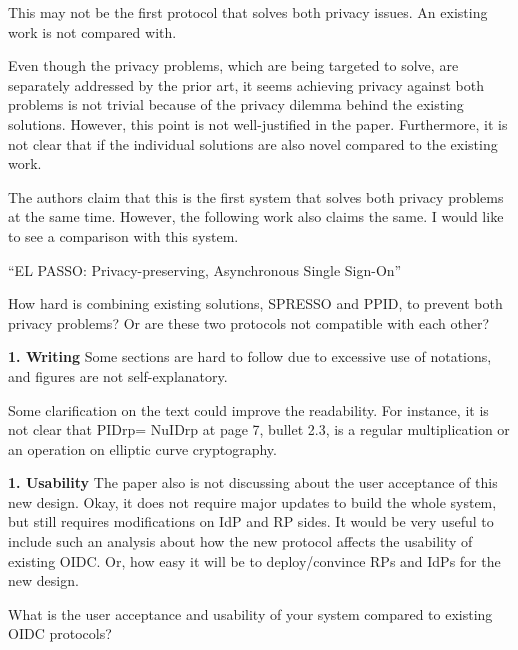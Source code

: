 \documentclass[letterpaper,onecolumn,10pt]{article}
\begin{document}
This may not be the first protocol that solves both privacy issues. An existing work is not compared with.

Even though the privacy problems, which are being targeted to solve, are separately addressed by the prior art, it seems achieving privacy against both problems is not trivial because of the privacy dilemma behind the existing solutions. However, this point is not well-justified in the paper. Furthermore, it is not clear that if the individual solutions are also novel compared to the existing work.


The authors claim that this is the first system that solves both privacy problems at the same time. However, the following work also claims the same. I would like to see a comparison with this system.

``EL PASSO: Privacy-preserving, Asynchronous Single Sign-On''


How hard is combining existing solutions, SPRESSO and PPID, to prevent both privacy problems? Or are these two protocols not compatible with each other?

\noindent\textbf{1. Writing}
Some sections are hard to follow due to excessive use of notations, and figures are not self-explanatory. 

Some clarification on the text could improve the readability. For instance, it is not clear that PIDrp= NuIDrp at page 7, bullet 2.3, is a regular multiplication or an operation on elliptic curve cryptography.


\noindent\textbf{1. Usability}
The paper also is not discussing about the user acceptance of this new design. Okay, it does not require major updates to build the whole system, but still requires modifications on IdP and RP sides. It would be very useful to include such an analysis about how the new protocol affects the usability of existing OIDC. Or, how easy it will be to deploy/convince RPs and IdPs for the new design.

What is the user acceptance and usability of your system compared to existing OIDC protocols?
\end{document}
